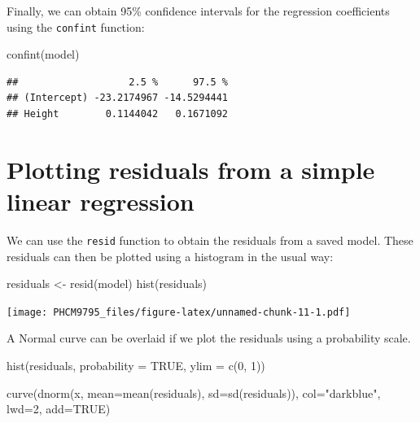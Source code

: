 \documentclass[
]{memoir}
\newenvironment{Shaded}{\begin{snugshade}}{\end{snugshade}}
\newcommand{\AttributeTok}[1]{\textcolor[rgb]{0.77,0.63,0.00}{#1}}
\newcommand{\ConstantTok}[1]{\textcolor[rgb]{0.00,0.00,0.00}{#1}}
\newcommand{\DecValTok}[1]{\textcolor[rgb]{0.00,0.00,0.81}{#1}}
\newcommand{\FunctionTok}[1]{\textcolor[rgb]{0.00,0.00,0.00}{#1}}
\newcommand{\NormalTok}[1]{#1}
\newcommand{\OtherTok}[1]{\textcolor[rgb]{0.56,0.35,0.01}{#1}}
\newcommand{\StringTok}[1]{\textcolor[rgb]{0.31,0.60,0.02}{#1}}
\begin{document}
Finally, we can obtain 95\% confidence intervals for the regression coefficients using the \texttt{confint} function:

\begin{Shaded}
\begin{Highlighting}[]
\FunctionTok{confint}\NormalTok{(model)}
\end{Highlighting}
\end{Shaded}

\begin{verbatim}
##                   2.5 %      97.5 %
## (Intercept) -23.2174967 -14.5294441
## Height        0.1144042   0.1671092
\end{verbatim}

\hypertarget{plotting-residuals-from-a-simple-linear-regression-1}{%
\section{Plotting residuals from a simple linear regression}\label{plotting-residuals-from-a-simple-linear-regression-1}}

We can use the \texttt{resid} function to obtain the residuals from a saved model. These residuals can then be plotted using a histogram in the usual way:

\begin{Shaded}
\begin{Highlighting}[]
\NormalTok{residuals }\OtherTok{\textless{}{-}} \FunctionTok{resid}\NormalTok{(model)}
\FunctionTok{hist}\NormalTok{(residuals)}
\end{Highlighting}
\end{Shaded}

\texttt{[image: PHCM9795\_files/figure-latex/unnamed-chunk-11-1.pdf]}

A Normal curve can be overlaid if we plot the residuals using a probability scale.

\begin{Shaded}
\begin{Highlighting}[]
\FunctionTok{hist}\NormalTok{(residuals, }\AttributeTok{probability =} \ConstantTok{TRUE}\NormalTok{,}
     \AttributeTok{ylim =} \FunctionTok{c}\NormalTok{(}\DecValTok{0}\NormalTok{, }\DecValTok{1}\NormalTok{))}

\FunctionTok{curve}\NormalTok{(}\FunctionTok{dnorm}\NormalTok{(x, }\AttributeTok{mean=}\FunctionTok{mean}\NormalTok{(residuals), }\AttributeTok{sd=}\FunctionTok{sd}\NormalTok{(residuals)), }
      \AttributeTok{col=}\StringTok{"darkblue"}\NormalTok{, }\AttributeTok{lwd=}\DecValTok{2}\NormalTok{, }\AttributeTok{add=}\ConstantTok{TRUE}\NormalTok{)}
\end{Highlighting}
\end{Shaded}
\end{document}
